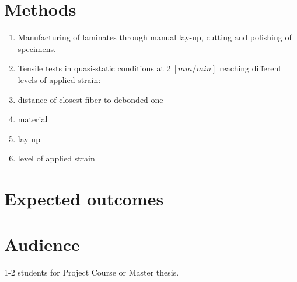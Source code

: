 \documentclass[review]{elsarticle}
\begin{document}
\section{Methods}
\begin{enumerate}
\item Manufacturing of laminates through manual lay-up, cutting and polishing of specimens.
\item Tensile tests in quasi-static conditions at $2\ \left[mm/min\right]$ reaching different levels of applied strain:
\item distance of closest fiber to debonded one
\item material
\item lay-up
\item level of applied strain
\end{enumerate}

\section{Expected outcomes}

\section{Audience}
1-2 students for Project Course or Master thesis.



\end{document}
